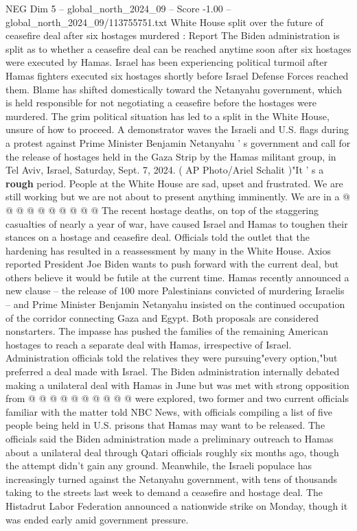 \begin{textsample}{NEG Dim 5 – global\_north\_2024\_09 – Score -1.00 – global\_north\_2024\_09/113755751.txt}  \label{ex:f5_neg_144}
White House split over the future of ceasefire deal after six hostages murdered : Report The Biden administration is split as to whether a ceasefire deal can be reached anytime soon after six hostages were executed by Hamas.
Israel has been experiencing political turmoil after Hamas fighters executed six hostages shortly before Israel Defense Forces reached them.
Blame has shifted domestically toward the Netanyahu government, which is held responsible for not negotiating a ceasefire before the hostages were murdered.
The grim political situation has led to a split in the White House, unsure of how to proceed.
A demonstrator waves the Israeli and U.S. flags during a protest against Prime Minister Benjamin Netanyahu ' s government and call for the release of hostages held in the Gaza Strip by the Hamas militant group, in Tel Aviv, Israel, Saturday, Sept. 7, 2024. ( AP Photo/Ariel Schalit )"It ' s a \textbf{rough} period.
People at the White House are sad, upset and frustrated.
We are still working but we are not about to present anything imminently.
We are in a @ @ @ @ @ @ @ @ @ @ The recent hostage deaths, on top of the staggering casualties of nearly a year of war, have caused Israel and Hamas to toughen their stances on a hostage and ceasefire deal.
Officials told the outlet that the hardening has resulted in a reassessment by many in the White House.
Axios reported President Joe Biden wants to push forward with the current deal, but others believe it would be futile at the current time.
Hamas recently announced a new clause -- the release of 100 more Palestinians convicted of murdering Israelis -- and Prime Minister Benjamin Netanyahu insisted on the continued occupation of the corridor connecting Gaza and Egypt.
Both proposals are considered nonstarters.
The impasse has pushed the families of the remaining American hostages to reach a separate deal with Hamas, irrespective of Israel.
Administration officials told the relatives they were pursuing"every option,"but preferred a deal made with Israel.
The Biden administration internally debated making a unilateral deal with Hamas in June but was met with strong opposition from @ @ @ @ @ @ @ @ @ @ were explored, two former and two current officials familiar with the matter told NBC News, with officials compiling a list of five people being held in U.S. prisons that Hamas may want to be released.
The officials said the Biden administration made a preliminary outreach to Hamas about a unilateral deal through Qatari officials roughly six months ago, though the attempt didn't gain any ground.
Meanwhile, the Israeli populace has increasingly turned against the Netanyahu government, with tens of thousands taking to the streets last week to demand a ceasefire and hostage deal.
The Histadrut Labor Federation announced a nationwide strike on Monday, though it was ended early amid government pressure.

\end{textsample}
